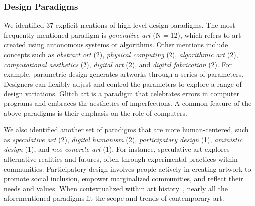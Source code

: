 \subsubsection{Design Paradigms}
\label{sssec:paradigm}
We identified 37 explicit mentions of high-level design paradigms. The most frequently mentioned paradigm is \textit{generative art} (N = 12), which refers to art created using autonomous systems or algorithms.
Other mentions include concepts such as \textit{abstract art} (2), \textit{physical computing} (2), \textit{algorithmic art} (2), \textit{computational aesthetics} (2), \textit{digital art} (2), and \textit{digital fabrication} (2).
For example, parametric design generates artworks through a series of parameters. Designers can flexibly adjust and control the parameters to explore a range of design variations. Glitch art is a paradigm that celebrates errors in computer programs and embraces the aesthetics of imperfections.
A common feature of the above paradigms is their emphasis on the role of computers.

We also identified another set of paradigms that are more human-centered, such as \textit{speculative art} (2), \textit{digital humanism} (2), \textit{participatory design} (1), \textit{aministic design} (1), and \textit{neo-concrete art} (1). For instance, speculative art explores alternative realities and futures, often through experimental practices within communities. Participatory design involves people actively in creating artwork to promote social inclusion, empower marginalized communities, and reflect their needs and values. 
When contextualized within art history~\cite{pooke2021art,hopkins2000after,perry2004themes}, nearly all the aforementioned paradigms fit the scope and trends of contemporary art.









